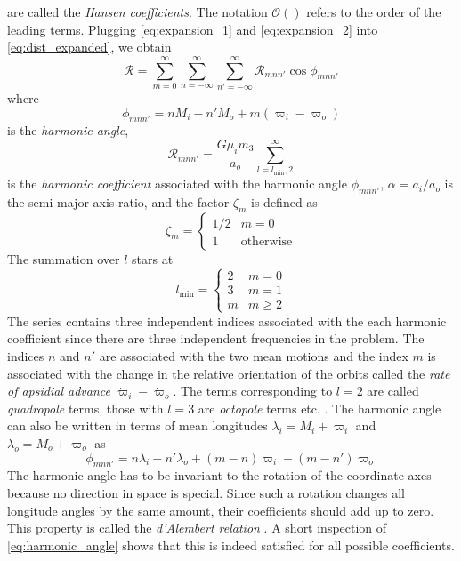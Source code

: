 \documentclass[ twoside,openright,titlepage,numbers=noenddot,headinclude,%
                footinclude=true,cleardoublepage=empty,abstractoff, %
                BCOR=5mm,paper=a4,fontsize=11pt,%
                american,%
                ]{scrreprt}
\begin{document}
are called the \emph{Hansen coefficients}. The notation $\mathcal{O}()$
refers to the order of the leading terms. Plugging \cref{eq:expansion_1}
and \cref{eq:expansion_2} into \cref{eq:dist_expanded}, we obtain
\citep{Mardling2013}
\begin{equation}
    \mathcal{R}=\sum^\infty_{m=0}\sum^\infty_{n=-\infty}\sum^\infty_{n'=-\infty}
    \mathcal{R}_{mnn'}\cos\phi_{mnn'}
    \label{eq:disturbing_function}
\end{equation}
where 
\begin{equation}
    \phi_{mnn'}=nM_i-n'M_o+m(\varpi_i-\varpi_o)
\end{equation}
is the \emph{harmonic angle},
\begin{equation}
    \mathcal{R}_{mnn'}= \frac{G\mu_im_3}{a_o} \sum^\infty_{l=l_\text{min},2}
    \label{eq:harmonic_coefficient}
\end{equation}
is the \emph{harmonic coefficient} associated with the harmonic angle
$\phi_{mnn'}$, $\alpha=a_i/a_o$ is the semi-major axis ratio, 
and the factor $\zeta_m$ is defined as
\begin{equation}
    \zeta_m=
    \begin{cases}
        1/2 & m=0\\
        1 & \text{otherwise}
    \end{cases}
\end{equation}
The summation over $l$ stars at
\begin{equation}
    l_\text{min}=
    \begin{cases}
        2 & m=0\\
        3 & m=1\\
        m & m\geq 2
    \end{cases}
\end{equation}
The series contains three independent indices associated with the each 
harmonic coefficient since there are three independent frequencies in the 
problem. The indices $n$ and $n'$ are associated with the  two mean 
motions and the index $m$ is associated with the change in the
relative orientation of the orbits called the 
\emph{rate of apsidial advance} $\dot{\varpi}_i-\dot{\varpi}_o$. 
The terms corresponding to $l=2$ are called \emph{quadropole} 
terms, those with $l=3$ are \emph{octopole} terms etc. . The harmonic
angle can also be written in terms of mean longitudes $\lambda_i=M_i+\varpi_i$
and $\lambda_o=M_o+\varpi_o$ as
\begin{equation}
    \phi_{mnn'}=n\lambda_i-n'\lambda_o+(m-n)\varpi_i-(m-n')\varpi_o
    \label{eq:harmonic_angle}
\end{equation}
The harmonic angle has to be invariant to the rotation of the coordinate axes 
because no direction in space is special.
Since such a rotation changes all longitude angles by the same amount, their 
coefficients should add up to zero. This property is called the 
\emph{d'Alembert relation} \citep{murray}. A short inspection of 
\cref{eq:harmonic_angle} shows that this is indeed satisfied for all possible
coefficients.
\end{document}
